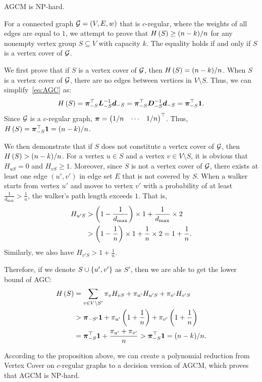 \documentclass[10pt,twocolumn,twoside]{IEEEtran}
\begin{document}
\begin{theorem}\label{thm:np-hard}
    AGCM is NP-hard.
\end{theorem}
\begin{IEEEproof}
    For a connected graph \(\mathcal{G}=(V,E,w)\) that is \(c\)-regular, where the weights of all edges are equal to \(1\), we attempt to prove that \(H\left(S\right)\ge (n-k)/n\) for any nonempty vertex group \(S\subseteq V\) with capacity \(k\).
    The equality holds if and only if \(S\) is a vertex cover of \(\mathcal{G}\).

    We first prove that if \(S\) is a vertex cover of \(\mathcal{G}\), then \(H\left(S\right)=(n-k)/n\). When \(S\) is a vertex cover of \(\mathcal{G}\), there are no edges between vertices in \(V\setminus S\).
    Thus, we can simplify~\eqref{eq:AGC} as:
    \begin{equation*}
        H\left(S\right)=\boldsymbol{\pi}_{-S}^\top\boldsymbol{L}_{-S}^{-1}\boldsymbol{d}_{-S}=\boldsymbol{\pi}_{-S}^\top\boldsymbol{D}_{-S}^{-1}\boldsymbol{d}_{-S}=\boldsymbol{\pi}_{-S}^\top\boldsymbol{1}.
    \end{equation*}
    Since \(\mathcal{G}\) is a \(c\)-regular graph, \(\boldsymbol{\pi}=\begin{pmatrix}1/n&\cdots&1/n\end{pmatrix}^\top\).
    Thus, \(H\left(S\right)=\boldsymbol{\pi}_{-S}^\top\boldsymbol{1}=(n-k)/n\).

    We then demonstrate that if \(S\) does not constitute a vertex cover of \(\mathcal{G}\), then \(H\left(S\right)>(n-k)/n\).
    For a vertex \(u\in S\) and a vertex \(v\in V\setminus S\), it is obvious that \(H_{uS}=0\) and \(H_{vS}\ge1\).
    Moreover, since \(S\) is not a vertex cover of \(\mathcal{G}\), there exists at least one edge \((u',v')\) in edge set \(E\) that is not covered by \(S\).
    When a walker starts from vertex \(u'\) and moves to vertex \(v'\) with a probability of at least \(\frac{1}{d_{\max}}>\frac{1}{n}\), the walker's path length exceeds \(1\).
    That is,
    \begin{align*}
        H_{u'S} & >\left( 1-\frac{1}{d_{\max}} \right)\times1+\frac{1}{d_{\max}}\times2  \\
                & >\left( 1-\frac{1}{n} \right)\times1+\frac{1}{n}\times2=1+\frac{1}{n}.
    \end{align*}
    Similarly, we also have \(H_{v'S}>1+\frac{1}{n}\).

    Therefore, if we denote \(S\cup\left\{u',v' \right\}\) as \(S'\), then we are able to get the lower bound of AGC:
    \begin{align*}
        H\left(S\right) & =\sum_{v\in V\setminus S'}\pi_vH_{vS}+\pi_{u'}H_{u'S}+\pi_{v'}H_{v'S}            \\
                 & >\boldsymbol{\pi}_{-S'}\boldsymbol{1}+\pi_{u'}\left( 1+\frac{1}{n} \right)+\pi_{v'}\left( 1+\frac{1}{n} \right) \\
                 & =\boldsymbol{\pi}_{-S}^\top\boldsymbol{1}+\frac{\pi_{u'}+\pi_{v'}}n
        >\boldsymbol{\pi}_{-S}^\top\boldsymbol{1}=(n-k)/n.
    \end{align*}

    According to the proposition above, we can create a polynomial reduction from Vertex Cover on \(c\)-regular graphs to a decision version of AGCM, which proves that AGCM is NP-hard.

\end{IEEEproof}
\end{document}
